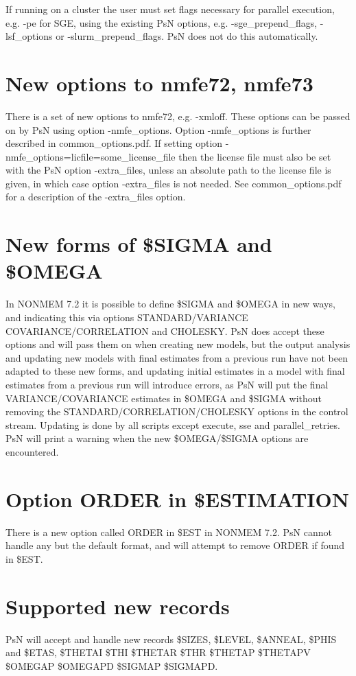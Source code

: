 If running on a cluster the user must set flags necessary for parallel execution, e.g. -pe for SGE, using the existing PsN options, e.g. -sge\_prepend\_flags, -lsf\_options or -slurm\_prepend\_flags. PsN does not do this automatically. 
\section{New options to nmfe72, nmfe73}
There is a set of new options to nmfe72, e.g. -xmloff. These options can be passed on by PsN using option -nmfe\_options. Option -nmfe\_options is further described in common\_options.pdf. If setting option -nmfe\_options=licfile=some\_license\_file then the license file must also be set with the PsN option -extra\_files, unless an absolute path to the license file is given, in which case option -extra\_files is not needed. See common\_options.pdf 
for a description of the -extra\_files option.

\section{New forms of \$SIGMA and \$OMEGA}
In NONMEM 7.2 it is possible to define \$SIGMA and \$OMEGA in new ways, and indicating this via options STANDARD/VARIANCE COVARIANCE/CORRELATION and CHOLESKY. PsN does accept these options and will pass them on when creating new models, but the output analysis and updating new models with final estimates from a previous run have not been adapted to these new forms, and 
updating initial estimates in a model with final estimates from a previous run
will introduce errors, as PsN will put the final VARIANCE/COVARIANCE estimates
in \$OMEGA and \$SIGMA without removing the STANDARD/CORRELATION/CHOLESKY
options in the control stream. 
Updating is done by all scripts except execute, sse and parallel\_retries. 
PsN will print a warning when the new \$OMEGA/\$SIGMA options are encountered.

\section{Option ORDER in \$ESTIMATION}
There is a new option called ORDER in \$EST in NONMEM 7.2. PsN 
cannot handle any but the default format, and will attempt to
remove ORDER if found in \$EST.

\section{Supported new records}
PsN will accept and handle new records \$SIZES, \$LEVEL, \$ANNEAL, \$PHIS and \$ETAS,
\$THETAI \$THI \$THETAR \$THR \$THETAP \$THETAPV \$OMEGAP \$OMEGAPD
\$SIGMAP \$SIGMAPD.

